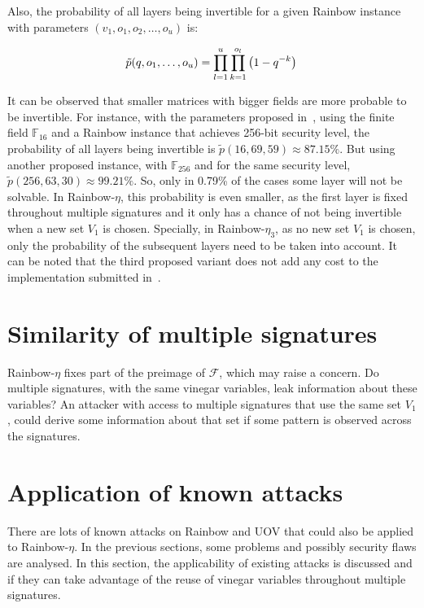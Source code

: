 \documentclass{ufsctex/ufsctex}
\begin{document}
Also, the probability of all layers being invertible for a given Rainbow
instance with parameters $(v_1, o_1, o_2, \ldots, o_u)$ is:

\begin{equation}
\tilde{p}(q, o_1, \ldots, o_u) =
	\prod_{l=1}^{u} \prod_{k=1}^{o_l} \left( 1 - q^{-k} \right) \\
\end{equation}

It can be observed that smaller matrices with bigger fields are more probable
to be invertible. For instance, with the parameters proposed in~\cite[Chapter
6]{petzoldt2013thesis}, using the finite field $\mathbb{F}_{16}$ and a Rainbow
instance that achieves 256-bit security level, the probability of all layers
being invertible is $\tilde{p}(16, 69, 59) \approx 87.15\%$. But using another
proposed instance, with $\mathbb{F}_{256}$ and for the same security level,
$\tilde{p}(256, 63, 30) \approx 99.21\%$. So, only in 0.79\% of the cases some
layer will not be solvable. In Rainbow-$\eta$, this probability is even
smaller, as the first layer is fixed throughout multiple signatures and it only
has a chance of not being invertible when a new set $V_1$ is chosen. Specially,
in Rainbow-$\eta_3$, as no new set $V_1$ is chosen, only the probability of the
subsequent layers need to be taken into account. It can be noted that the third
proposed variant does not add any cost to the implementation submitted
in~\cite{ding2017nist}.

\section{Similarity of multiple signatures}

Rainbow-$\eta$ fixes part of the preimage of $\mathcal{F}$, which may raise a
concern. Do multiple signatures, with the same vinegar variables, leak
information about these variables? An attacker with access to multiple
signatures that use the same set $V_1$, could derive some information about
that set if some pattern is observed across the signatures.


\section{Application of known attacks}

There are lots of known attacks on Rainbow and UOV that could also be applied
to Rainbow-$\eta$. In the previous sections, some problems and possibly
security flaws are analysed. In this section, the applicability of existing
attacks is discussed and if they can take advantage of the reuse of vinegar
variables throughout multiple signatures.
\end{document}
